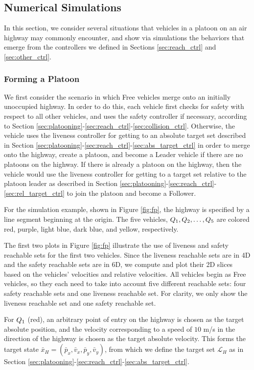 \subsection{Numerical Simulations}
In this section, we consider several situations that vehicles in a platoon on an air highway may commonly encounter, and show via simulations the behaviors that emerge from the controllers we defined in Sections \ref{sec:reach_ctrl} and \ref{sec:other_ctrl}.

\subsubsection{Forming a Platoon}
We first consider the scenario in which Free vehicles merge onto an initially unoccupied highway. In order to do this, each vehicle first checks for safety with respect to all other vehicles, and uses the safety controller if necessary, according to Section \ref{sec:platooning}-\ref{sec:reach_ctrl}-\ref{sec:collision_ctrl}. Otherwise, the vehicle uses the liveness controller for getting to an absolute target set described in Section \ref{sec:platooning}-\ref{sec:reach_ctrl}-\ref{sec:abs_target_ctrl} in order to merge onto the highway, create a platoon, and become a Leader vehicle if there are no platoons on the highway. If there is already a platoon on the highway, then the vehicle would use the liveness controller for getting to a target set relative to the platoon leader as described in Section \ref{sec:platooning}-\ref{sec:reach_ctrl}-\ref{sec:rel_target_ctrl} to join the platoon and become a Follower.

For the simulation example, shown in Figure \ref{fig:fp}, the highway is specified by a line segment beginning at the origin. The five vehicles, $Q_{1}, Q_{2}, \ldots, Q_{5}$ are colored red, purple, light blue, dark blue, and yellow, respectively.

The first two plots in Figure \ref{fig:fp} illustrate the use of liveness and safety reachable sets for the first two vehicles. Since the liveness reachable sets are in 4D and the safety reachable sets are in 6D, we compute and plot their 2D slices based on the vehicles' velocities and relative velocities.  All vehicles begin as Free vehicles, so they each need to take into account five different reachable sets: four safety reachable sets and one liveness reachable set. For clarity, we only show the liveness reachable set and one safety reachable set. 

For $Q_{1}$ (red), an arbitrary point of entry on the highway is chosen as the target absolute position, and the velocity corresponding to a speed of $10$ m/s in the direction of the highway is chosen as the target absolute velocity. This forms the target state $\bar{x}_H=(\bar{p}_x, \bar{v}_x, \bar{p}_y, \bar{v}_y)$, from which we define the target set $\mathcal{L}_H$ as in Section \ref{sec:platooning}-\ref{sec:reach_ctrl}-\ref{sec:abs_target_ctrl}.

